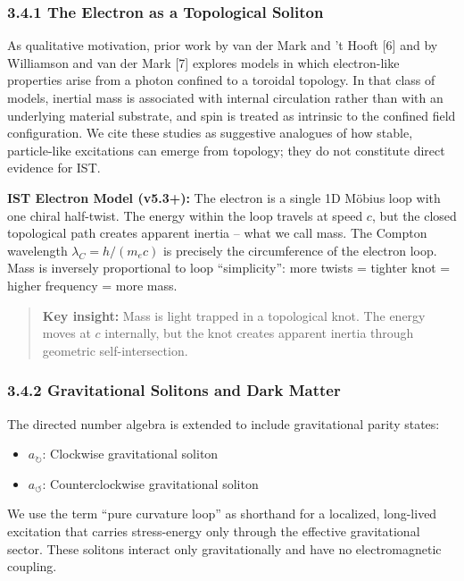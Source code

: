 \documentclass[
  11pt,
]{article}
\providecommand{\tightlist}{%
  \setlength{\itemsep}{0pt}\setlength{\parskip}{0pt}}
\begin{document}
\subsubsection{3.4.1 The Electron as a Topological
Soliton}\label{the-electron-as-a-topological-soliton}

As qualitative motivation, prior work by van der Mark and 't Hooft
{[}6{]} and by Williamson and van der Mark {[}7{]} explores models in
which electron-like properties arise from a photon confined to a
toroidal topology. In that class of models, inertial mass is associated
with internal circulation rather than with an underlying material
substrate, and spin is treated as intrinsic to the confined field
configuration. We cite these studies as suggestive analogues of how
stable, particle-like excitations can emerge from topology; they do not
constitute direct evidence for IST.

\textbf{IST Electron Model (v5.3+):} The electron is a single 1D Möbius
loop with one chiral half-twist. The energy within the loop travels at
speed \(c\), but the closed topological path creates apparent inertia --
what we call mass. The Compton wavelength \(\lambda_C = h/(m_e c)\) is
precisely the circumference of the electron loop. Mass is inversely
proportional to loop ``simplicity'': more twists = tighter knot = higher
frequency = more mass.

\begin{quote}
\textbf{Key insight:} Mass is light trapped in a topological knot. The
energy moves at \(c\) internally, but the knot creates apparent inertia
through geometric self-intersection.
\end{quote}

\subsubsection{3.4.2 Gravitational Solitons and Dark
Matter}\label{gravitational-solitons-and-dark-matter}

The directed number algebra is extended to include gravitational parity
states:

\begin{itemize}
\tightlist
\item
  \textbf{\(a_{\circlearrowright}\)}: Clockwise gravitational soliton
\item
  \textbf{\(a_{\circlearrowleft}\)}: Counterclockwise gravitational
  soliton
\end{itemize}

We use the term ``pure curvature loop'' as shorthand for a localized,
long-lived excitation that carries stress-energy only through the
effective gravitational sector. These solitons interact only
gravitationally and have no electromagnetic coupling.
\end{document}
